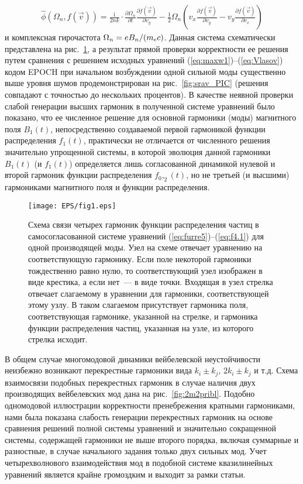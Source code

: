 \begin{align}
\label{eq:oper.1}
    \hat{\phi}(\Omega_{n},f(\vec{v}))  =  \frac{\mathrm{i}}{2nk}\cdot\frac{\partial \Omega_{n}}{\partial t}\frac{\partial f(\vec{v})}{\partial v_y} -\frac{1}{2}\Omega_{n} \left(v_x\frac{\partial f(\vec{v})}{\partial v_y}-v_y\frac{\partial f(\vec{v})}{\partial v_x}\right)
\end{align}
и комплексная гирочастота $\Omega_n={e B_n}/{(m_\mathrm{e} c)}$. Данная система схематически представлена на рис.~\ref{fig:1m2pribl_1}, а результат прямой проверки корректности ее решения путем сравнения с решением исходных уравнений (\ref{eq:maxw1})--(\ref{eq:Vlasov}) кодом EPOCH при начальном возбуждении одной сильной моды существенно выше уровня шумов продемонстрирован на рис.~\ref{fig:srav_PIC} (решения совпадают с точностью до нескольких процентов). В качестве неявной проверки слабой генерации высших гармоник в полученной системе уравнений было показано, что ее численное решение для основной гармоники (моды) магнитного поля $B_1(t)$, непосредственно создаваемой первой гармоникой функции распределения $f_1(t)$, практически не отличается от численного решения значительно упрощенной системы, в которой эволюция данной гармоники $B_1(t)$ (и $f_1(t)$) определяется лишь согласованной динамикой нулевой и второй гармоник функции распределения $f_0,_2(t)$, но не третьей (и высшими) гармониками магнитного поля и функции распределения.

\begin{figure}[t]
\texttt{[image: EPS/fig1.eps]}
\centering
\caption{Схема связи четырех гармоник функции распределения частиц в самосогласованной системе уравнений (\ref{eq:furre5})--(\ref{eq:f4.1}) для одной производящей моды. Узел на схеме отвечает уравнению на соответствующую гармонику. Если поле некоторой гармоники тождественно равно нулю, то соответствующий узел изображен в виде крестика, а если нет~--- в виде точки. Входящая в узел стрелка отвечает слагаемому в уравнении для гармоники, соответствующей этому узлу. В таком слагаемом присутствует гармоника поля, соответствующая гармонике, указанной на стрелке, и гармоника функции распределения частиц, указанная на узле, из которого стрелка исходит.} 
\label{fig:1m2pribl_1}
\end{figure}

В общем случае многомодовой динамики вейбелевской неустойчивости неизбежно возникают перекрестные гармоники вида $k_i\pm k_j$, $2k_i\pm k_j$ и т.д. Схема взаимосвязи подобных перекрестных гармоник в случае наличия двух производящих вейбелевских мод дана на рис.~\ref{fig:2m2pribl}. Подобно одномодовой иллюстрации корректности пренебрежения кратными гармониками, нами была показана слабость генерации перекрестных гармоник на основе сравнения решений полной системы уравнений и значительно сокращенной системы, содержащей гармоники не выше второго порядка, включая суммарные и разностные, в случае начального задания только двух сильных мод. Учет четырехволнового взаимодействия мод в подобной системе квазилинейных уравнений является крайне громоздким и выходит за рамки статьи.


